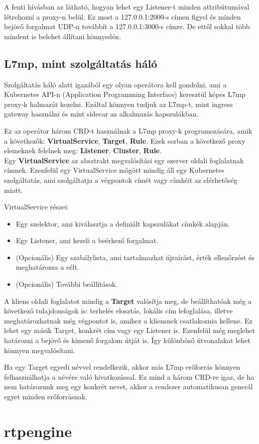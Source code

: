 A fenti hívásban az látható, hogyan lehet egy Listener-t minden attribútumával 
létrehozni a proxy-n belül. Ez most a 127.0.0.1:2000-s címen figyel és minden 
bejövő forgalmat UDP-n továbbít a 127.0.0.1:3000-s címre. De ettől sokkal több
mindent is belehet állítani könnyedén. 

\subsection{L7mp, mint szolgáltatás háló}

Szolgáltatás háló alatt igazából egy olyan operátora kell gondolni, ami a Kubernetes
API-n (Application Programming Interface) keresztül képes L7mp proxy-k halmazát 
kezelni. Ezáltal könnyen tudjuk az L7mp-t, mint ingress gateway használni és 
mint sidecar az alkalmazás kapszulákban.

Ez az operátor három CRD-t használnak a L7mp proxy-k programozására, amik a következők:
\textbf{VirtualService}, \textbf{Target}, \textbf{Rule}. Ezek sorban a következő proxy 
elemeknek felelnek meg: \textbf{Listener}, \textbf{Cluster}, \textbf{Rule}. \\ 

Egy \textbf{VirtualService} az absztrakt megvalósítási egy szerver oldali foglalatnak címnek. 
Ezenfelül egy VirtualService mögött mindig áll egy Kubernetes szolgáltatás, ami 
szolgáltatja a végpontok címét vagy címkéit az elérhetőség miatt.

VirtualService részei: 

\begin{itemize}
	\item Egy szelektor, ami kiválasztja a definiált kapszulákat címkék alapján.
	\item Egy Listener, ami kezeli a beérkező forgalmat. 
	\item (Opcionális) Egy szabálylista, ami tartalmazhat újraírást, érték ellenőrzést
	és meghatározza a célt. 
	\item (Opcionális) További beállítások.  
\end{itemize}

A kliens oldali foglalatot mindig a \textbf{Target} valósítja meg, de beállíthatóak még a 
következő tulajdonságok is: terhelés elosztás, lokális cím lefoglalása, illetve 
meghatározhatnak még végpontot is, amihez a kliensnek csatlakoznia kellene. Ez 
lehet egy másik Target, konkrét cím vagy egy Listener is. Ezenfelül még meglehet 
határozni a bejövő és kimenő forgalom útját is. Így különböző útvonalakat lehet 
könnyen megvalósítani. 

Ha egy Target egyedi névvel rendelkezik, akkor más L7mp erőforrás könnyen 
felhasználhatja a névére való hivatkozással. Ez mind a három CRD-re igaz, de ha
nem határozunk meg egy konkrét nevet, akkor a rendszer automatikusan generál 
egyet minden erőforrásnak. 


\section{rtpengine}

 